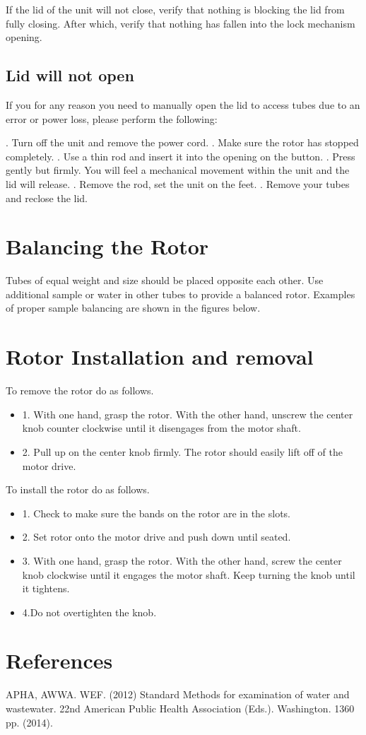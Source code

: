 \documentclass[12pt]{../SOP3_beta}\usepackage[]{graphicx}\usepackage[]{color}
\begin{document}
\NP If the lid of the unit will not close, verify that nothing is blocking the lid from fully closing. After which, verify that nothing has fallen into the lock mechanism opening. 

\subsection*{Lid will not open}

\NP If you for any reason you need to manually open the lid to access tubes due to an error or power loss, please perform the following:

. Turn off the unit and remove the power cord.
. Make sure the rotor has stopped completely.
. Use a thin rod and insert it into the opening on the button.
. Press gently but firmly. You will feel a mechanical movement within the unit and the lid will release.
. Remove the rod, set the unit on the feet.
. Remove your tubes and reclose the lid. 

\section{Balancing the Rotor}

\NP Tubes of equal weight and size should be placed opposite each other. Use additional sample or water in other tubes to provide a balanced rotor. Examples of proper sample balancing are shown in the figures below. 
\section{Rotor Installation and removal}

\NP To remove the rotor do as follows.
\begin{itemize}
  \item 1. With one hand, grasp the rotor. With the other hand, unscrew the center knob counter clockwise until it disengages from the motor shaft.
  \item 2. Pull up on the center knob firmly. The rotor should easily lift off of the motor drive.
\end{itemize}

\NP To install the rotor do as follows.
\begin{itemize}
  \item 1. Check to make sure the bands on the rotor are in the slots.
  \item 2. Set rotor onto the motor drive and push down until seated.
  \item 3. With one hand, grasp the rotor. With the other hand, screw the center knob clockwise until it engages the motor shaft. Keep turning the knob until it tightens.
  \item 4.Do not overtighten the knob.
\end{itemize}


\section{References}

\NP APHA, AWWA. WEF. (2012) Standard Methods for examination of water and wastewater. 22nd American Public Health Association (Eds.). Washington. 1360 pp. (2014).
\end{document}
